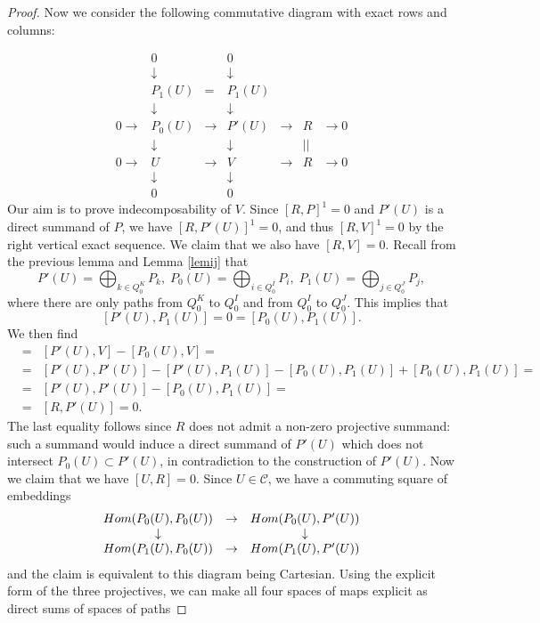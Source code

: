 \documentclass[10pt,a4paper]{amsart}
\begin{document}
\begin{proof}
Now we consider the following commutative diagram with exact rows and columns:

$$\begin{array}{ccccccc}
&0&&0&&&\\ &\downarrow&&\downarrow&&&\\ &P_1(U)&=&P_1(U)&&&\\
&\downarrow&&\downarrow&&&\\
0\rightarrow&P_0(U)&\rightarrow&P'(U)&\rightarrow&R&\rightarrow 0\\
&\downarrow&&\downarrow&&||&\\
0\rightarrow&U&\rightarrow&V&\rightarrow&R&\rightarrow 0\\
&\downarrow&&\downarrow&&&\\ &0&&0&&&\end{array}$$
Our aim is to prove indecomposability of $V$. Since $[R,P]^1=0$ and $P'(U)$ is a direct summand of $P$, we have $[R,P'(U)]^1=0$, and thus $[R,V]^1=0$ by the right vertical exact sequence. We claim that we also have $[R,V]=0$. Recall from the previous lemma and Lemma \ref{lemij} that 
$$P'(U)=\bigoplus_{k\in Q_0^K}P_k,\; P_0(U)=\bigoplus_{i\in Q_0^I}P_i,\; P_1(U)=\bigoplus_{j\in Q_0^J}P_j,$$
where there are only paths from $Q_0^K$ to $Q_0^I$ and from $Q_0^I$ to $Q_0^J$. This implies that 
$$[P'(U),P_1(U)]=0=[P_0(U),P_1(U)].$$
We then find
\begin{eqnarray*}
[R,V]&=&[P'(U),V]-[P_0(U),V]=\\
&=&[P'(U),P'(U)]-[P'(U),P_1(U)]-[P_0(U),P_1(U)]+[P_0(U),P_1(U)]=\\
&=&[P'(U),P'(U)]-[P_0(U),P_1(U)]=\\
&=&[R,P'(U)]=0.\end{eqnarray*}
The last equality follows since $R$ does not admit a non-zero projective summand: such a summand would induce a direct summand of $P'(U)$ which does not intersect $P_0(U)\subset P'(U)$, in contradiction to the construction of $P'(U)$.
Now we claim that we have $[U,R]=0$. Since $U\in\mathcal{C}$, we have a commuting square of embeddings
$$\begin{array}{ccc}
{\rm Hom}(P_0(U),P_0(U))&\rightarrow&{\rm Hom}(P_0(U),P'(U))\\
\downarrow&&\downarrow\\
{\rm Hom}(P_1(U),P_0(U))&\rightarrow&{\rm Hom}(P_1(U),P'(U))\end{array}$$
and the claim is equivalent to this diagram being Cartesian. Using the explicit form of the three projectives, we can make all four spaces of maps explicit as direct sums of spaces of paths

\end{proof}
\end{document}
